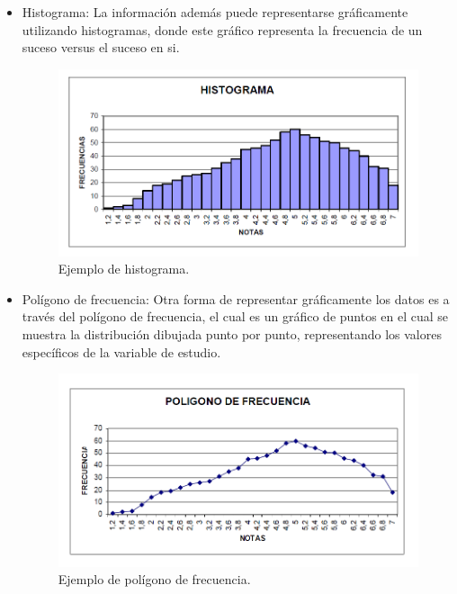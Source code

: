 \begin{itemize}
	\item Histograma: La información además puede representarse gráficamente utilizando histogramas, donde este gráfico representa la frecuencia de un suceso versus el suceso en si.\\
		
	\begin{figure}[htb]
		\label{Figura5}
		\begin{center}
			\includegraphics[scale=0.4]{imagenes/histograma.png}
		\end{center}
		\caption{Ejemplo de histograma.}
	\end{figure}
\end{itemize}

\clearpage
\newpage 

\begin{itemize}	
	\item Polígono de frecuencia: Otra forma de representar gráficamente los datos es a través del polígono de frecuencia, el cual es un gráfico de puntos en el cual se muestra la distribución dibujada punto por punto, representando los valores específicos de la variable de estudio.\\

	\begin{figure}[htb]
		\label{Figura6}
		\begin{center}
			\includegraphics[scale=0.4]{imagenes/poligono.png}
		\end{center}
		\caption{Ejemplo de polígono de frecuencia.}
	\end{figure}
	
\end{itemize}


